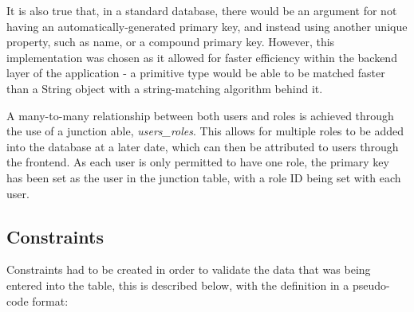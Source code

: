 It is also true that, in a standard database, there would be an argument for not having an automatically-generated primary key, and instead using another unique property, such as name, or a compound primary key. However, this implementation was chosen as it allowed for faster efficiency within the backend layer of the application - a primitive type would be able to be matched faster than a String object with a string-matching algorithm behind it.

A many-to-many relationship between both users and roles is achieved through the use of a junction able, \textit{users\_roles}. This allows for multiple roles to be added into the database at a later date, which can then be attributed to users through the frontend. As each user is only permitted to have one role, the primary key has been set as the user in the junction table, with a role ID being set with each user.

\subsection{Constraints}

Constraints had to be created in order to validate the data that was being entered into the table, this is described below, with the definition in a pseudo-code format:

\begin{table}[H]
\centering
{}
\caption{A list of constraints in the points\_of\_interest relation}
\label{poi_constraints}
\end{table}

